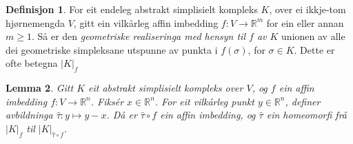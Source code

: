 \documentclass[a4paper, titlepage, 12pt, norsk]{article}
\theoremstyle{plain}
\newtheorem{theorem}{Teorem}[section]
\newtheorem{lemma}[theorem]{Lemma}
\theoremstyle{definition}
\newtheorem{definition}[theorem]{Definisjon}
\newcommand{\Rb}{\mathbb{R}}
\newcommand{\gr}[1]{ \lvert #1 \rvert } %
\begin{document}
\begin{definition}
	For eit endeleg abstrakt simplisielt kompleks $K$, over ei ikkje-tom hjørnemengda $V$, gitt ein vilkårleg affin imbedding $f:V\to\Rb^m$ for ein eller annan $m\geq1$. Så er den \emph{geometriske realiseringa med hensyn til $f$ av \( K \)} unionen av alle dei geometriske simpleksane utspunne av punkta i $f(\sigma)$, for $\sigma\in K$. Dette er ofte betegna $\gr{K}_f$
\end{definition}


\begin{lemma} \label{thm:tau-homeomorfi}
	Gitt \( K \) eit abstrakt simplisielt kompleks over \( V \), og \( f \) ein affin imbedding \( f: V \to \Rb^n \). Fiksér \( x \in \Rb^n \). For eit vilkårleg punkt \( y \in \Rb^n \), definer avbildninga \( \hat{\tau}: y \mapsto y-x \). Då er \( \hat{\tau} \circ f \) ein affin imbedding, og \( \hat{\tau} \) ein homeomorfi frå \( \gr{K}_f \) til \( \gr{K}_{\hat{\tau} \circ f} \).
\end{lemma}
\end{document}
